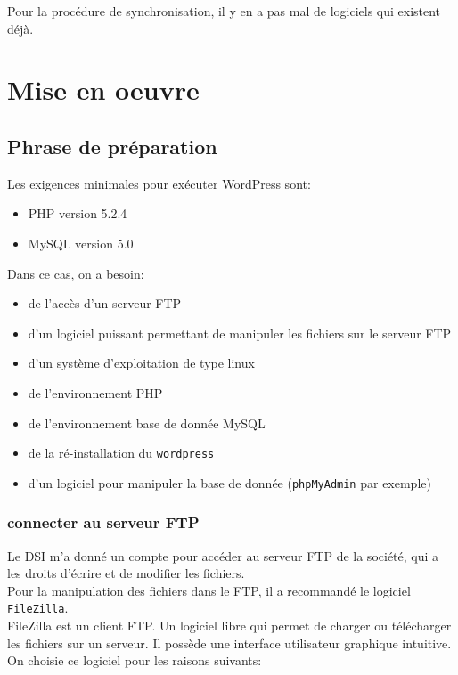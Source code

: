 Pour la procédure de synchronisation, il y en a pas mal de logiciels qui existent déjà.

\section{Mise en oeuvre}
  \subsection{Phrase de préparation}
Les exigences minimales pour exécuter WordPress sont:

\begin{itemize}
\item PHP version 5.2.4 
\item MySQL version 5.0 \\
\end{itemize}

Dans ce cas, on a besoin:
\begin{itemize}
\item de l’accès d'un serveur FTP
\item d'un logiciel puissant permettant de manipuler les fichiers sur le serveur FTP 
\item d'un système d'exploitation de type linux
\item de l'environnement PHP
\item de l'environnement base de donnée MySQL
\item de la ré-installation du \texttt{wordpress}
\item d'un logiciel pour manipuler la base de donnée (\texttt{phpMyAdmin} par exemple)
\end{itemize}

     \subsubsection{connecter au serveur FTP} 
Le DSI m'a donné un compte pour accéder au serveur FTP de la société, qui a les droits d'écrire et de modifier les fichiers.\\

Pour la manipulation des fichiers dans le FTP, il a recommandé le logiciel \texttt{FileZilla}.\\

FileZilla est un client FTP. Un logiciel libre qui permet de charger ou télécharger les fichiers sur un serveur. Il possède une interface utilisateur graphique intuitive. On choisie ce logiciel pour les raisons suivants:\\

